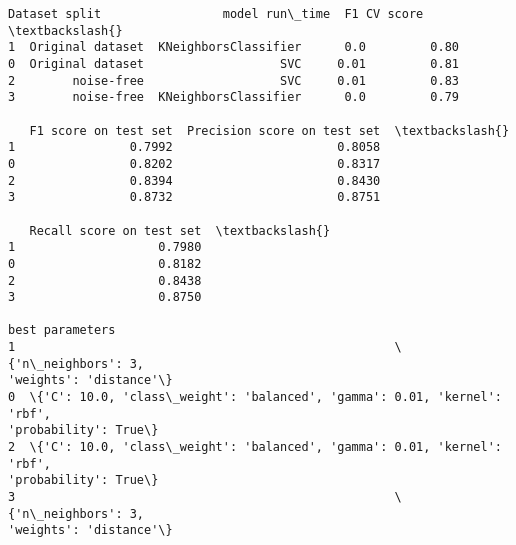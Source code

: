\documentclass[11pt]{article}
\makeatletter
\newcommand{\boxspacing}{\kern\kvtcb@left@rule\kern\kvtcb@boxsep}
\newcommand{\prompt}[4]{
        {\ttfamily\llap{{\color{#2}[#3]:\hspace{3pt}#4}}\vspace{-\baselineskip}}
    }
\makeatother
\begin{document}
            \begin{tcolorbox}[breakable, size=fbox, boxrule=.5pt, pad at break*=1mm, opacityfill=0]
\prompt{Out}{outcolor}{853}{\boxspacing}
\begin{Verbatim}[commandchars=\\\{\}]
      Dataset split                 model run\_time  F1 CV score  \textbackslash{}
1  Original dataset  KNeighborsClassifier      0.0         0.80
0  Original dataset                   SVC     0.01         0.81
2        noise-free                   SVC     0.01         0.83
3        noise-free  KNeighborsClassifier      0.0         0.79

   F1 score on test set  Precision score on test set  \textbackslash{}
1                0.7992                       0.8058
0                0.8202                       0.8317
2                0.8394                       0.8430
3                0.8732                       0.8751

   Recall score on test set  \textbackslash{}
1                    0.7980
0                    0.8182
2                    0.8438
3                    0.8750

best parameters
1                                                     \{'n\_neighbors': 3,
'weights': 'distance'\}
0  \{'C': 10.0, 'class\_weight': 'balanced', 'gamma': 0.01, 'kernel': 'rbf',
'probability': True\}
2  \{'C': 10.0, 'class\_weight': 'balanced', 'gamma': 0.01, 'kernel': 'rbf',
'probability': True\}
3                                                     \{'n\_neighbors': 3,
'weights': 'distance'\}
\end{Verbatim}
\end{tcolorbox}
        
\end{document}
